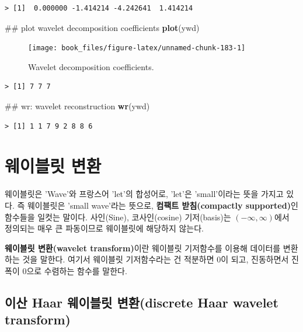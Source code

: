 \documentclass[b5paper,]{scrbook}
\makeatletter
\newenvironment{Shaded}{\begin{snugshade}}{\end{snugshade}}
\newcommand{\KeywordTok}[1]{\textcolor[rgb]{0.13,0.29,0.53}{\textbf{#1}}}
\newcommand{\NormalTok}[1]{#1}
\theoremstyle{plain}
\theoremstyle{definition}
\numberwithin{equation}{section}
\newenvironment{kframe}{%
\medskip{}
\setlength{\fboxsep}{.8em}
 \def\at@end@of@kframe{}%
 \ifinner\ifhmode%
  \def\at@end@of@kframe{\end{minipage}}%
  \begin{minipage}{\columnwidth}%
 \fi\fi%
 \def\FrameCommand##1{\hskip\@totalleftmargin \hskip-\fboxsep
 \colorbox{shadecolor}{##1}\hskip-\fboxsep
     \hskip-\linewidth \hskip-\@totalleftmargin \hskip\columnwidth}%
 \MakeFramed {\advance\hsize-\width
   \@totalleftmargin\z@ \linewidth\hsize
   \@setminipage}}%
 {\par\unskip\endMakeFramed%
 \at@end@of@kframe}
\renewenvironment{Shaded}{\begin{kframe}}{\end{kframe}}
\makeatother
\begin{document}
\begin{verbatim}
> [1]  0.000000 -1.414214 -4.242641  1.414214
\end{verbatim}

\begin{Shaded}
\begin{Highlighting}[]
\NormalTok{## plot wavelet decomposition coefficients}
\KeywordTok{plot}\NormalTok{(ywd)}
\end{Highlighting}
\end{Shaded}

\begin{figure}

{\centering \texttt{[image: book\_files/figure-latex/unnamed-chunk-183-1]} 

}

\caption{Wavelet decomposition coefficients.}\label{fig:unnamed-chunk-183}
\end{figure}

\begin{verbatim}
> [1] 7 7 7
\end{verbatim}

\begin{Shaded}
\begin{Highlighting}[]
\NormalTok{## wr: wavelet reconstruction}
\KeywordTok{wr}\NormalTok{(ywd)}
\end{Highlighting}
\end{Shaded}

\begin{verbatim}
> [1] 1 1 7 9 2 8 8 6
\end{verbatim}

\chapter{웨이블릿 변환}\label{wavelettransform}

웨이블릿은 'Wave'와 프랑스어 'let'의 합성어로, 'let'은 'small'이라는
뜻을 가지고 있다. 즉 웨이블릿은 'small wave'라는 뜻으로, \textbf{컴팩트
받침(compactly supported)}인 함수들을 일컷는 말이다. 사인(Sine),
코사인(cosine) 기저(basis)는 \((-\infty, \infty)\)에서 정의되는 매우 큰
파동이므로 웨이블릿에 해당하지 않는다.

\textbf{웨이블릿 변환(wavelet transform)}이란 웨이블릿 기저함수를 이용해
데이터를 변환하는 것을 말한다. 여기서 웨이블릿 기저함수라는 건 적분하면
0이 되고, 진동하면서 진폭이 0으로 수렴하는 함수를 말한다.

\section{이산 Haar 웨이블릿 변환(discrete Haar wavelet
transform)}\label{-haar--discrete-haar-wavelet-transform}
\end{document}
